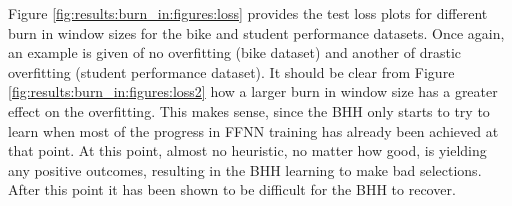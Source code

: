 Figure \ref{fig:results:burn_in:figures:loss} provides the test loss plots for different burn in window sizes for the bike and student performance datasets. Once again, an example is given of no overfitting (bike dataset) and another of drastic overfitting (student performance dataset). It should be clear from Figure \ref{fig:results:burn_in:figures:loss2} how a larger burn in window size has a greater effect on the overfitting. This makes sense, since the \Ac{BHH} only starts to try to learn when most of the progress in \ac{FFNN} training has already been achieved at that point. At this point, almost no heuristic, no matter how good, is yielding any positive outcomes, resulting in the \Ac{BHH} learning to make bad selections. After this point it has been shown to be difficult for the \Ac{BHH} to recover.




